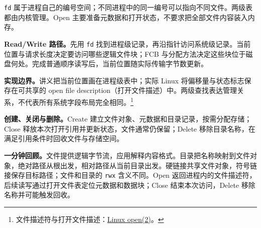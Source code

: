 \texttt{fd} 属于进程自己的编号空间；不同进程中的同一编号可以指向不同文件。两级表都由内核管理。Open 主要准备元数据和打开状态，不要求把全部文件内容装入内存。

\textbf{Read/Write 路径。}先用 \texttt{fd} 找到进程级记录，再沿指针访问系统级记录。当前位置与请求长度决定要访问哪些逻辑文件块；FCB 与分配方法决定这些块位于磁盘何处。完成普通顺序读写后，当前位置随实际传输字节数更新。

\textbf{实现边界。}讲义把当前位置画在进程级表中；实际 Linux 将偏移量与状态标志保存在可共享的 open file description（打开文件描述）中。两级查找表达管理关系，不代表所有系统字段布局完全相同。\footnote{文件描述符与打开文件描述：\href{https://man7.org/linux/man-pages/man2/open.2.html}{Linux open(2)}。}

\textbf{创建、关闭与删除。}Create 建立文件对象、元数据和目录记录，按需分配存储；Close 释放本次打开引用并更新状态，文件通常仍保留；Delete 移除目录名称，在满足引用条件时回收文件与存储空间。

\textbf{一分钟回顾。}文件提供逻辑字节流，应用解释内容格式。目录把名称映射到文件对象，绝对路径从根出发，相对路径从当前目录出发。硬链接共享文件对象，符号链接保存目标路径；文件和目录的 \texttt{rwx} 含义不同。Open 返回进程内的文件描述符，后续读写通过打开文件表定位元数据和数据块；Close 结束本次访问，Delete 移除名称并可能触发回收。
\endgroup
